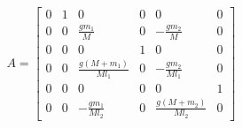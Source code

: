 \documentclass[preview]{standalone}
\begin{document}
\begin{align*}
A = \left[\begin{matrix}0 & 1 & 0 & 0 & 0 & 0\\0 & 0 & \frac{g m_{1}}{M} & 0 & - \frac{g m_{2}}{M} & 0\\0 & 0 & 0 & 1 & 0 & 0\\0 & 0 & \frac{g \left(M + m_{1}\right)}{M l_{1}} & 0 & - \frac{g m_{2}}{M l_{1}} & 0\\0 & 0 & 0 & 0 & 0 & 1\\0 & 0 & - \frac{g m_{1}}{M l_{2}} & 0 & \frac{g \left(M + m_{2}\right)}{M l_{2}} & 0\end{matrix}\right]
\end{align*}
\end{document}
